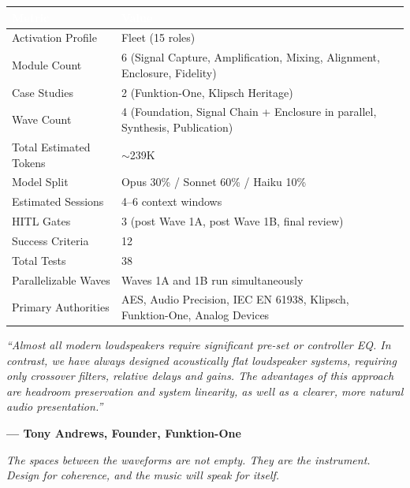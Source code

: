 \documentclass[11pt,letterpaper]{article}
\newcommand{\tableheader}[1]{\textbf{\sffamily\textcolor{white}{#1}}}
\begin{document}
\begin{center}
\begin{tabularx}{\textwidth}{L{5cm}X}
\toprule
{}
\tableheader{Metric} & \tableheader{Value} \\
\midrule
Activation Profile & Fleet (15 roles) \\
Module Count & 6 (Signal Capture, Amplification, Mixing, Alignment, Enclosure, Fidelity) \\
Case Studies & 2 (Funktion-One, Klipsch Heritage) \\
Wave Count & 4 (Foundation, Signal Chain + Enclosure in parallel, Synthesis, Publication) \\
Total Estimated Tokens & $\sim$239K \\
Model Split & Opus 30\% / Sonnet 60\% / Haiku 10\% \\
Estimated Sessions & 4--6 context windows \\
HITL Gates & 3 (post Wave 1A, post Wave 1B, final review) \\
Success Criteria & 12 \\
Total Tests & 38 \\
Parallelizable Waves & Waves 1A and 1B run simultaneously \\
Primary Authorities & AES, Audio Precision, IEC EN 61938, Klipsch, Funktion-One, Analog Devices \\
\bottomrule
\end{tabularx}
\end{center}

\vspace{2em}

\begin{quotebox}
\textit{``Almost all modern loudspeakers require significant pre-set or controller EQ. In contrast, we have always designed acoustically flat loudspeaker systems, requiring only crossover filters, relative delays and gains. The advantages of this approach are headroom preservation and system linearity, as well as a clearer, more natural audio presentation.''}

\medskip
\textbf{--- Tony Andrews, Founder, Funktion-One}

\medskip
\textit{The spaces between the waveforms are not empty. They are the instrument. Design for coherence, and the music will speak for itself.}
\end{quotebox}
\end{document}
